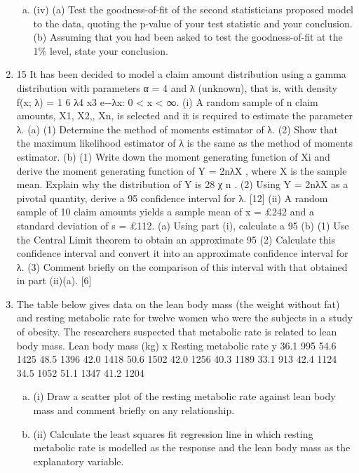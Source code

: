 \documentclass[a4paper,12pt]{article}
\begin{document}
\begin{enumerate}
\begin{enumerate}[(a)]
\item (iv) (a) Test the goodness-of-fit of the second statisticians proposed model
to the data, quoting the p-value of your test statistic and your
conclusion.
(b) Assuming that you had been asked to test the goodness-of-fit at
the 1\% level, state your conclusion.
\end{enumerate}
\item 
15 It has been decided to model a claim amount distribution using a gamma
distribution with parameters α = 4 and λ (unknown), that is, with density
f(x; λ) =
1
6
λ4 x3 e−λx: 0 < x < ∞.
(i) A random sample of n claim amounts, X1, X2,, Xn, is selected and it is
required to estimate the parameter λ.
(a) (1) Determine the method of moments estimator of λ.
(2) Show that the maximum likelihood estimator of λ is the
same as the method of moments estimator.
(b) (1) Write down the moment generating function of Xi and
derive the moment generating function of Y = 2nλX , where
X is the sample mean. Explain why the distribution of Y
is 28
χ n .
(2) Using Y = 2nλX as a pivotal quantity, derive a 95%
confidence interval for λ. [12]
(ii) A random sample of 10 claim amounts yields a sample mean of x = £242
and a standard deviation of s = £112.
(a) Using part (i), calculate a 95%
(b) (1) Use the Central Limit theorem to obtain an approximate
95%
(2) Calculate this confidence interval and convert it into an
approximate confidence interval for λ.
(3) Comment briefly on the comparison of this interval with
that obtained in part (ii)(a). [6]
\item  The table below gives data on the lean body mass (the weight without fat) and
resting metabolic rate for twelve women who were the subjects in a study of
obesity. The researchers suspected that metabolic rate is related to lean body
mass.
Lean body mass (kg)
x
Resting metabolic rate
y
36.1 995
54.6 1425
48.5 1396
42.0 1418
50.6 1502
42.0 1256
40.3 1189
33.1 913
42.4 1124
34.5 1052
51.1 1347
41.2 1204
\begin{enumerate}[(a)]
    \item (i) Draw a scatter plot of the resting metabolic rate against lean body mass and comment briefly on any relationship.
   \item (ii) Calculate the least squares fit regression line in which resting metabolic rate is modelled as the response and the lean body mass as the explanatory variable. 

\end{enumerate}
\end{enumerate}
\end{document}
